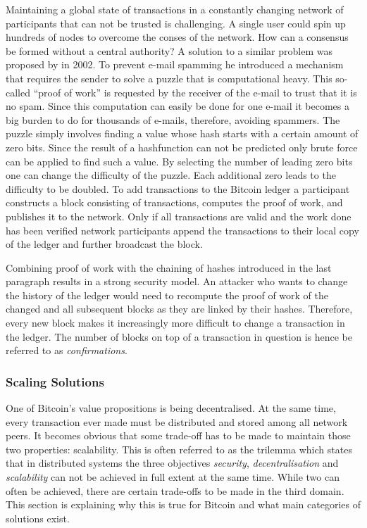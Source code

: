 \documentclass[final]{fhnwreport}       %
\begin{document}
Maintaining a global state of transactions in a constantly changing network of participants that can not be trusted is challenging. A single user could spin up hundreds of nodes to overcome the conses of the network. How can a consensus be formed without a central authority? A solution to a similar problem was proposed by \textcite{back_hashcash_2002} in 2002. To prevent e-mail spamming he introduced a mechanism that requires the sender to solve a puzzle that is computational heavy. This so-called ``proof of work'' is requested by the receiver of the e-mail to trust that it is no spam. Since this computation can easily be done for one e-mail it becomes a big burden to do for thousands of e-mails, therefore, avoiding spammers. The puzzle simply involves finding a value whose \gls{hash} starts with a certain amount of zero bits. Since the result of a \gls{hashfunction} can not be predicted only brute force can be applied to find such a value. By selecting the number of leading zero bits one can change the difficulty of the puzzle. Each additional zero leads to the difficulty to be doubled. To add transactions to the Bitcoin ledger a participant constructs a block consisting of transactions, computes the proof of work, and publishes it to the network. Only if all transactions are valid and the work done has been verified network participants append the transactions to their local copy of the ledger and further broadcast the block.

Combining proof of work with the chaining of hashes introduced in the last paragraph results in a strong security model. An attacker who wants to change the history of the ledger would need to recompute the proof of work of the changed and all subsequent blocks as they are linked by their hashes. Therefore, every new block makes it increasingly more difficult to change a transaction in the ledger. The number of blocks on top of a transaction in question is hence be referred to as \emph{confirmations}.  

\subsubsection{Scaling Solutions}
One of Bitcoin's value propositions is being decentralised. At the same time, every transaction ever made must be distributed and stored among all network peers. It becomes obvious that some trade-off has to be made to maintain those two properties: scalability. This is often referred to as the \gls{trilemma} which states that in distributed systems the three objectives \emph{security}, \emph{decentralisation} and \emph{scalability} can not be achieved in full extent at the same time. While two can often be achieved, there are certain trade-offs to be made in the third domain. This section is explaining why this is true for Bitcoin and what main categories of solutions exist.
\end{document}
